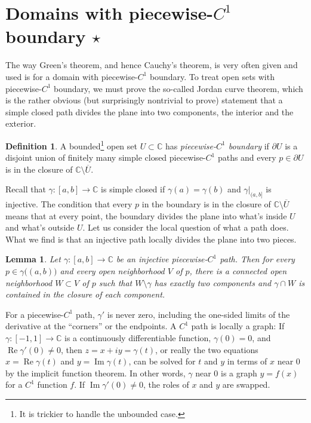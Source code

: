 \documentclass[12pt,openany]{book}
\newcommand{\widebar}[1]{\overline{#1}}
\renewcommand{\Re}{\operatorname{Re}}
\renewcommand{\Im}{\operatorname{Im}}
\newcommand{\C}{{\mathbb{C}}}
\newcommand{\myindex}[1]{#1\index{#1}}
\newcommand{\myquote}[1]{``#1''}
\theoremstyle{plain}
\newtheorem{lemma}[thm]{Lemma}
\theoremstyle{remark}
\theoremstyle{definition}
\newtheorem{defn}[thm]{Definition}
\theoremstyle{exercise}
\theoremstyle{example}
\begin{document}

\section{Domains with piecewise-\texorpdfstring{$C^1$}{C¹} boundary \texorpdfstring{$\star$}{*}}

The way Green's theorem, and hence Cauchy's theorem,
is very often given and used
is for a domain with piecewise-$C^1$
boundary.  To treat open sets with piecewise-$C^1$ boundary, we must
prove the so-called Jordan curve theorem, which is the rather obvious (but
surprisingly nontrivial to prove) statement that a simple closed path
divides the plane into two components, the interior and the exterior.

\begin{defn}
A bounded\footnote{It is trickier to handle the unbounded case.}
open set $U \subset \C$ has
\emph{\myindex{piecewise-$C^1$ boundary}} if $\partial U$
is a disjoint union of finitely many
simple closed piecewise-$C^1$ paths and 
every $p \in \partial U$ is in the closure of
$\C \setminus \widebar{U}$.
\end{defn}

Recall that $\gamma \colon [a,b] \to \C$ is simple closed if
$\gamma(a)=\gamma(b)$ and $\gamma|_{(a,b]}$ is injective.
The condition that every $p$ in the boundary is in the closure of $\C
\setminus \widebar{U}$ means that at every point, the boundary divides
the plane into what's inside $U$ and what's outside $U$.  Let us consider
the local question of what a path does.
What we find is that an injective path locally divides the plane into two pieces.

\begin{lemma}
Let $\gamma \colon [a,b] \to \C$ be an injective piecewise-$C^1$ path.
Then for every $p \in \gamma \bigl((a,b)\bigr)$ and every
open neighborhood $V$ of $p$, there is a
connected open neighborhood $W \subset V$ of $p$ such that
$W \setminus \gamma$
has exactly two components and $\gamma \cap W$ is contained in the
closure of each component.
\end{lemma}

For a piecewise-$C^1$ path, $\gamma'$ is never
zero, including the one-sided limits of the derivative at the
\myquote{corners} or
the endpoints.  A $C^1$ path is locally a graph:
If $\gamma \colon [-1,1] \to \C$ is a continuously differentiable function,
$\gamma(0) = 0$,
and $\Re \gamma'(0) \neq 0$, then
$z=x+iy = \gamma(t)$, or really the two equations
$x = \Re \gamma(t)$ and $y = \Im \gamma(t)$,
can be solved for $t$ and $y$ in terms of $x$ near $0$ by the implicit function
theorem.  In other words, $\gamma$ near $0$ is a graph $y=f(x)$ for a $C^1$
function $f$.  If $\Im \gamma'(0) \neq 0$, the roles of $x$ and $y$ are
swapped.
\end{document}
